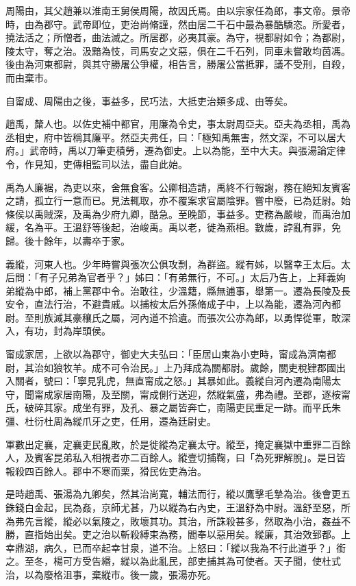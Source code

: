 \begin{pinyinscope}
周陽由，其父趙兼以淮南王舅侯周陽，故因氏焉。由以宗家任為郎，事文帝。景帝時，由為郡守。武帝即位，吏治尚脩謹，然由居二千石中最為暴酷驕恣。所愛者，撓法活之；所憎者，曲法滅之。所居郡，必夷其豪。為守，視都尉如令；為都尉，陵太守，奪之治。汲黯為忮，司馬安之文惡，俱在二千石列，同車未嘗敢均茵馮。後由為河東都尉，與其守勝屠公爭權，相告言，勝屠公當抵罪，議不受刑，自殺，而由棄市。

自甯成、周陽由之後，事益多，民巧法，大抵吏治類多成、由等矣。

趙禹，斄人也。以佐史補中都官，用廉為令史，事太尉周亞夫。亞夫為丞相，禹為丞相史，府中皆稱其廉平。然亞夫弗任，曰：「極知禹無害，然文深，不可以居大府。」武帝時，禹以刀筆吏積勞，遷為御史。上以為能，至中大夫。與張湯論定律令，作見知，吏傳相監司以法，盡自此始。

禹為人廉裾，為吏以來，舍無食客。公卿相造請，禹終不行報謝，務在絕知友賓客之請，孤立行一意而已。見法輒取，亦不覆案求官屬陰罪。嘗中廢，已為廷尉。始條侯以禹賊深，及禹為少府九卿，酷急。至晚節，事益多。吏務為嚴峻，而禹治加緩，名為平。王溫舒等後起，治峻禹。禹以老，徙為燕相。數歲，誖亂有罪，免歸。後十餘年，以壽卒于家。

義縱，河東人也。少年時嘗與張次公俱攻剽，為群盜。縱有姊，以醫幸王太后。太后問：「有子兄弟為官者乎？」姊曰：「有弟無行，不可。」太后乃告上，上拜義姁弟縱為中郎，補上黨郡中令。治敢往，少溫籍，縣無逋事，舉第一。遷為長陵及長安令，直法行治，不避貴戚。以捕桉太后外孫脩成子中，上以為能，遷為河內都尉。至則族滅其豪穰氏之屬，河內道不拾遺。而張次公亦為郎，以勇悍從軍，敢深入，有功，封為岸頭侯。

甯成家居，上欲以為郡守，御史大夫弘曰：「臣居山東為小吏時，甯成為濟南都尉，其治如狼牧羊。成不可令治民。」上乃拜成為關都尉。歲餘，關吏稅肄郡國出入關者，號曰：「寧見乳虎，無直甯成之怒。」其暴如此。義縱自河內遷為南陽太守，聞甯成家居南陽，及至關，甯成側行送迎，然縱氣盛，弗為禮。至郡，逐桉甯氏，破碎其家。成坐有罪，及孔、暴之屬皆奔亡，南陽吏民重足一跡。而平氏朱彊、杜衍杜周為縱爪牙之吏，任用，遷為廷尉史。

軍數出定襄，定襄吏民亂敗，於是徙縱為定襄太守。縱至，掩定襄獄中重罪二百餘人，及賓客昆弟私入相視者亦二百餘人。縱壹切捕鞠，曰「為死罪解脫」。是日皆報殺四百餘人。郡中不寒而栗，猾民佐吏為治。

是時趙禹、張湯為九卿矣，然其治尚寬，輔法而行，縱以鷹擊毛摯為治。後會更五銖錢白金起，民為姦，京師尤甚，乃以縱為右內史，王溫舒為中尉。溫舒至惡，所為弗先言縱，縱必以氣陵之，敗壞其功。其治，所誅殺甚多，然取為小治，姦益不勝，直指始出矣。吏之治以斬殺縛束為務，閻奉以惡用矣。縱廉，其治效郅都。上幸鼎湖，病久，已而卒起幸甘泉，道不治。上怒曰：「縱以我為不行此道乎？」銜之。至冬，楊可方受告緡，縱以為此亂民，部吏捕其為可使者。天子聞，使杜式治，以為廢格沮事，棄縱市。後一歲，張湯亦死。


\end{pinyinscope}

